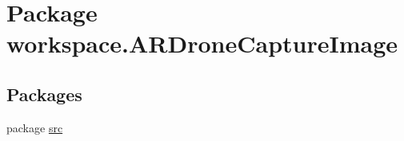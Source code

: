 \hypertarget{namespaceworkspace_1_1_a_r_drone_capture_image}{}\section{Package workspace.\+A\+R\+Drone\+Capture\+Image}
\label{namespaceworkspace_1_1_a_r_drone_capture_image}
\subsection*{Packages}
\begin{DoxyCompactItemize}
\item 
package \hyperlink{namespaceworkspace_1_1_a_r_drone_capture_image_1_1src}{src}
\end{DoxyCompactItemize}
